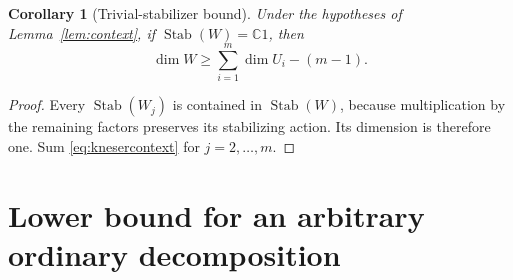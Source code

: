 \documentclass[11pt]{article}
\newtheorem{corollary}[theorem]{Corollary}
\theoremstyle{definition}
\theoremstyle{remark}
\newcommand{\C}{\mathbb C}
\newcommand{\Stab}{\operatorname{Stab}}
\begin{document}
\begin{corollary}[Trivial-stabilizer bound]\label{cor:trivial}
Under the hypotheses of Lemma~\ref{lem:context}, if $\Stab(W)=\C1$, then
\begin{equation}\label{eq:trivial}
 \dim W\ge\sum_{i=1}^m\dim U_i-(m-1).
\end{equation}
\end{corollary}
\begin{proof}
Every $\Stab(W_j)$ is contained in $\Stab(W)$, because multiplication by the
remaining factors preserves its stabilizing action. Its dimension is therefore
one. Sum \eqref{eq:knesercontext} for $j=2,\ldots,m$.
\end{proof}

\section{Lower bound for an arbitrary ordinary decomposition}\label{sec:lower}
\end{document}
